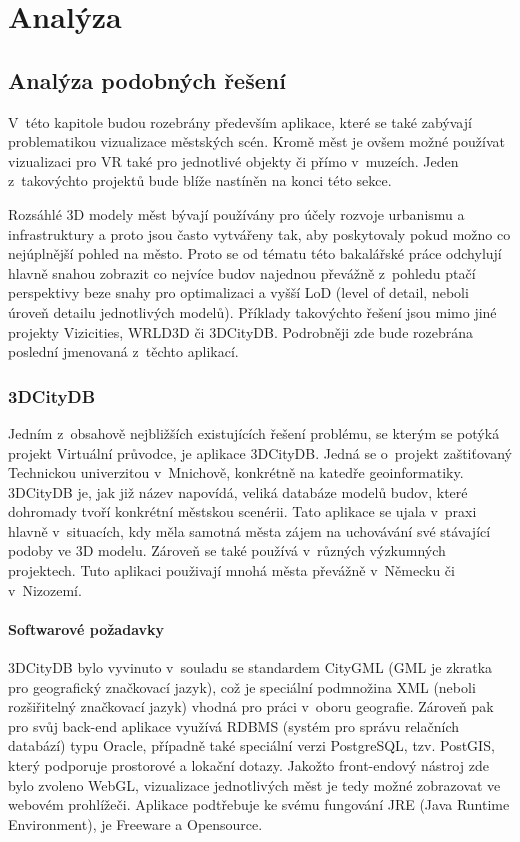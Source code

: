 \documentclass[thesis=B,czech]{FITthesis}[2012/06/26]
\begin{document}
\chapter{Analýza}
	\section{Analýza podobných řešení}
	
		 V~této kapitole budou rozebrány především aplikace, které se také zabývají problematikou vizualizace městských scén.	Kromě měst je ovšem možné používat vizualizaci pro VR také pro jednotlivé objekty či přímo v~muzeích. Jeden z~takovýchto projektů bude blíže nastíněn na konci této sekce.	
		  
		 Rozsáhlé 3D modely měst bývají používány pro účely rozvoje urbanismu a infrastruktury a proto jsou často vytvářeny tak, aby poskytovaly pokud možno co nejúplnější pohled na město. Proto se od tématu této bakalářské práce odchylují hlavně snahou zobrazit co nejvíce budov najednou převážně z~pohledu ptačí perspektivy beze snahy pro optimalizaci a vyšší LoD (level of detail, neboli úroveň detailu jednotlivých modelů). Příklady takovýchto řešení jsou mimo jiné projekty Vizicities, WRLD3D či 3DCityDB. Podrobněji zde bude rozebrána poslední jmenovaná z~těchto aplikací.

 \subsection{3DCityDB}
    
    Jedním z~obsahově nejbližších existujících řešení problému, se kterým se potýká projekt Virtuální průvodce, je aplikace 3DCityDB. Jedná se o~projekt zaštiťovaný Technickou univerzitou v~Mnichově, konkrétně na katedře geoinformatiky. 3DCityDB je, jak již název napovídá, veliká databáze modelů budov, které dohromady tvoří konkrétní městskou scenérii. Tato aplikace se ujala v~praxi hlavně v~situacích, kdy měla samotná města zájem na uchovávání své stávající podoby ve 3D modelu. Zároveň se také používá v~různých výzkumných projektech. Tuto aplikaci použivají mnohá města převážně v~Německu či v~Nizozemí. \cite{3DCityDB}
        
        \subsubsection{Softwarové požadavky}
        
    
        3DCityDB bylo vyvinuto v~souladu se standardem CityGML (GML je zkratka pro geografický značkovací jazyk), což je speciální podmnožina XML (neboli rozšiřitelný značkovací jazyk) vhodná pro práci v~oboru geografie. Zároveň pak pro svůj back-end aplikace využívá RDBMS (systém pro správu relačních databází) typu Oracle, případně také speciální verzi PostgreSQL, tzv. PostGIS, který podporuje prostorové a lokační dotazy. Jakožto front-endový nástroj zde bylo zvoleno WebGL, vizualizace jednotlivých měst je tedy možné zobrazovat ve webovém prohlížeči. Aplikace podtřebuje ke svému fungování JRE (Java Runtime Environment), je Freeware a Opensource. \cite{3DCityDB}
        
\end{document}

